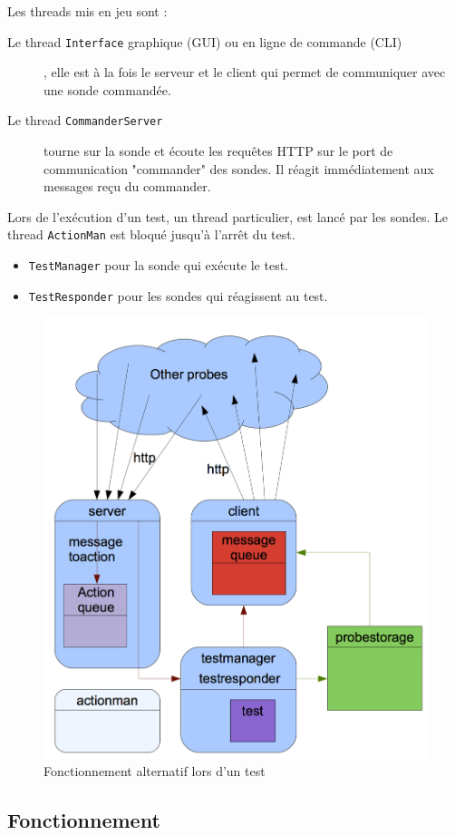 \documentclass[a4paper,11pt]{article}
\newcommand{\cd}[1]{\texttt{#1}}
\begin{document}
Les threads mis en jeu sont :
\begin{description}
\item[Le thread \cd{Interface} graphique (GUI) ou en ligne de commande (CLI)], elle est à la fois le serveur et le client qui permet de communiquer avec une sonde commandée.
\item[Le thread \cd{CommanderServer}] tourne sur la sonde et écoute les requêtes HTTP sur le port de communication "commander" des sondes. Il réagit immédiatement aux messages reçu du commander.
\end{description}
Lors de l'exécution d'un test, un thread particulier, est lancé par les sondes. Le thread \cd{ActionMan} est bloqué jusqu'à l'arrêt du test.
\begin{itemize}
\item \cd{TestManager} pour la sonde qui exécute le test.
\item \cd{TestResponder} pour les sondes qui réagissent au test.
\end{itemize}

\begin{figure}[!ht]
\centering\includegraphics[width=0.8\linewidth]{img/graphTest.png}
\caption{Fonctionnement alternatif lors d'un test}
\end{figure}

\FloatBarrier


\subsection{Fonctionnement}
\end{document}
